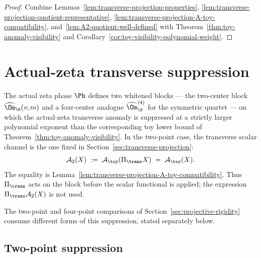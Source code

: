 \begin{proof}
Combine Lemmas~\ref{lem:transverse-projection-properties},
\ref{lem:transverse-projection-quotient-representative},
\ref{lem:transverse-projection-A-toy-compatibility},
and~\ref{lem:A2-quotient-well-defined} with
Theorem~\ref{thm:toy-anomaly-visibility} and
Corollary~\ref{cor:toy-visibility-polynomial-weight}.
\end{proof}


\section{Actual-zeta transverse suppression}
\label{sec:actual-zeta-transverse-suppression}
\quad
{}\quad
{}\quad
{}\quad
{}\quad
{}
\par\medskip

The actual zeta phase \(\Ph\) defines two whitened blocks --- the
two-center block \(\widehat\Om_\z(s;m)\) and a four-center analogue
\(\widehat\Om_\z^{(4)}\) for the symmetric quartet --- on which the
actual-zeta transverse anomaly is suppressed at a strictly larger
polynomial exponent than the corresponding toy lower bound of
Theorem~\ref{thm:toy-anomaly-visibility}.  In the two-point case, the
transverse scalar channel is the one fixed in
Section~\ref{sec:transverse-projection}:
\[
        \mathcal A_2(X)
        \;:=\;\mathcal A_\toy(\Pi_\trans X)
        \;=\;\mathcal A_\toy(X).
\]
The equality is
Lemma~\ref{lem:transverse-projection-A-toy-compatibility}.  Thus
\(\Pi_\trans\) acts on the block before the scalar functional is
applied; the expression \(\Pi_\trans\mathcal A_2(X)\) is not used.

The two-point and four-point comparisons of
Section~\ref{sec:projective-rigidity} consume different forms of this
suppression, stated separately below.

\subsection{Two-point suppression}
\label{subsec:two-point-suppression}

